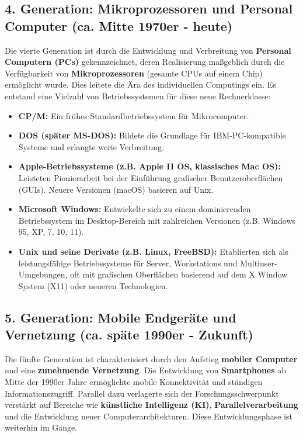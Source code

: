 \subsection{4. Generation: Mikroprozessoren und Personal Computer (ca. Mitte 1970er - heute)}

Die vierte Generation ist durch die Entwicklung und Verbreitung von \textbf{Personal Computern (PCs)} gekennzeichnet, deren Realisierung maßgeblich durch die Verfügbarkeit von \textbf{Mikroprozessoren} (gesamte CPUs auf einem Chip) ermöglicht wurde. Dies leitete die Ära des individuellen Computings ein. Es entstand eine Vielzahl von Betriebssystemen für diese neue Rechnerklasse:

\begin{itemize}
    \item \textbf{CP/M:} Ein frühes Standardbetriebssystem für Mikrocomputer.
    \item \textbf{DOS (später MS-DOS):} Bildete die Grundlage für IBM-PC-kompatible Systeme und erlangte weite Verbreitung.
    \item \textbf{Apple-Betriebssysteme (z.B. Apple II OS, klassisches Mac OS):} Leisteten Pionierarbeit bei der Einführung grafischer Benutzeroberflächen (GUIs). Neuere Versionen (macOS) basieren auf Unix.
    \item \textbf{Microsoft Windows:} Entwickelte sich zu einem dominierenden Betriebssystem im Desktop-Bereich mit zahlreichen Versionen (z.B. Windows 95, XP, 7, 10, 11).
    \item \textbf{Unix und seine Derivate (z.B. Linux, FreeBSD):} Etablierten sich als leistungsfähige Betriebssysteme für Server, Workstations und Multiuser-Umgebungen, oft mit grafischen Oberflächen basierend auf dem X Window System (X11) oder neueren Technologien.
\end{itemize}

\subsection{5. Generation: Mobile Endgeräte und Vernetzung (ca. späte 1990er - Zukunft)}

Die fünfte Generation ist charakterisiert durch den Aufstieg \textbf{mobiler Computer} und eine \textbf{zunehmende Vernetzung}. Die Entwicklung von \textbf{Smartphones} ab Mitte der 1990er Jahre ermöglichte mobile Konnektivität und ständigen Informationszugriff. Parallel dazu verlagerte sich der Forschungsschwerpunkt verstärkt auf Bereiche wie \textbf{künstliche Intelligenz (KI)}, \textbf{Parallelverarbeitung} und die Entwicklung neuer Computerarchitekturen. Diese Entwicklungsphase ist weiterhin im Gange.

